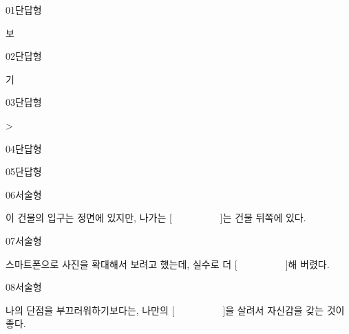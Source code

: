 \documentclass[fs95,seriesFre]{korfarm-base}
\begin{document}
\kfActivityBg \par{}\par\nopagebreak[4]\smallskip\nopagebreak[4]
\begin{kfConnect}
\end{kfConnect}

\kfActivityBg \par{}\par\nopagebreak[4]\smallskip\nopagebreak[4]


\begin{kfQBlock}{01}{단답형}
\begin{kfEvidence}보\end{kfEvidence}
\end{kfQBlock}
\begin{kfQBlock}{02}{단답형}
\begin{kfEvidence}기\end{kfEvidence}
\end{kfQBlock}
\begin{kfQBlock}{03}{단답형}
\begin{kfEvidence}>\end{kfEvidence}
\end{kfQBlock}
\begin{kfQBlock}{04}{단답형}
\end{kfQBlock}
\begin{kfQBlock}{05}{단답형}
\end{kfQBlock}
\begin{kfQBlock}{06}{서술형}
\begin{kfEvidence}이 건물의 입구는 정면에 있지만, 나가는 [　　　　　]는 건물 뒤쪽에 있다.\end{kfEvidence}
\end{kfQBlock}
\begin{kfQBlock}{07}{서술형}
\begin{kfEvidence}스마트폰으로 사진을 확대해서 보려고 했는데, 실수로 더 [　　　　　]해 버렸다.\end{kfEvidence}
\end{kfQBlock}
\begin{kfQBlock}{08}{서술형}
\begin{kfEvidence}나의 단점을 부끄러워하기보다는, 나만의 [　　　　　]을 살려서 자신감을 갖는 것이 좋다.\end{kfEvidence}
\end{kfQBlock}
\end{document}
